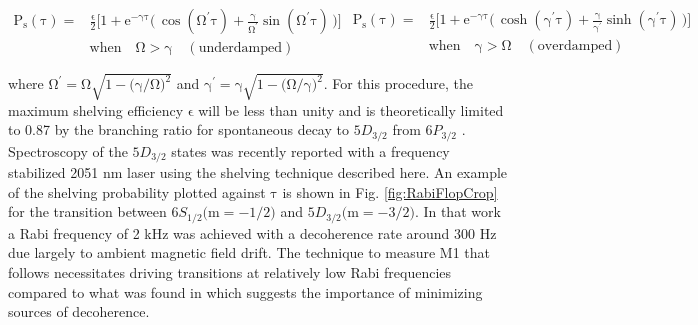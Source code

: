\documentclass[%
 reprint,
 amsmath,amssymb,
 aps,
]{revtex4-1}
\begin{document}
\begin{subequations}\label{eq:ShelveEff}
\begin{equation}\label{eq:ShelveEffA}
\begin{split}
\mathrm{P_{s}(\tau)}=&\mathrm{\frac{\epsilon}{2}\Big[1 + e^{-\gamma\tau}\big(\,\cos(\Omega^{'}\tau) + \frac{\gamma}{\Omega^{'}}\sin(\Omega^{'}\tau)\,\big) \Big] }\\
&\mathrm{when}\quad\mathrm{\Omega>\gamma}\quad\mathrm{(underdamped)}
\end{split}
\end{equation}
\begin{equation}\label{eq:ShelveEffB}
\begin{split}
\mathrm{P_{s}(\tau)} =  &\mathrm{\frac{\epsilon}{2}\Big[1 + e^{-\gamma\tau}\big(\,\cosh(\gamma^{'}\tau) + \frac{\gamma}{\gamma^{'}}\sinh(\gamma^{'}\tau)\,\big)\Big]}\\
&\mathrm{when}\quad\mathrm{\gamma>\Omega} \quad\mathrm{(overdamped)}
\end{split}
\end{equation}
\end{subequations}

\noindent where $\mathrm{\Omega^{'} = \Omega\sqrt{1-\big(\gamma/ \Omega\big)^{2}}}$ and $\mathrm{\gamma^{'} = \gamma\sqrt{1-\big(\Omega/\gamma\big)^{2}}}$.  For this procedure, the maximum shelving efficiency $\mathrm{\epsilon}$ will be less than unity and is theoretically limited to 0.87 by the branching ratio for spontaneous decay to $5D_{3/2}$ from $6P_{3/2}$ \cite{Kurz08}.  Spectroscopy of the $5D_{3/2}$ states was recently reported with a frequency stabilized 2051 nm laser \citep{Hoffman12} using the shelving technique described here.  An example of the shelving probability plotted against $\mathrm{\tau}$ is shown in Fig. \ref{fig:RabiFlopCrop} for the transition between $6S_{1/2}\big( \mathrm{m}=-1/2\big)$ and $5D_{3/2}\big( \mathrm{m}=-3/2\big)$. In that work a Rabi frequency of 2 kHz was achieved with a decoherence rate around 300 Hz due largely to ambient magnetic field drift.  The technique to measure M1 that follows necessitates driving transitions at relatively low Rabi frequencies compared to what was found in \citep{Hoffman12} which suggests the importance of minimizing sources of decoherence.  

\end{document}
